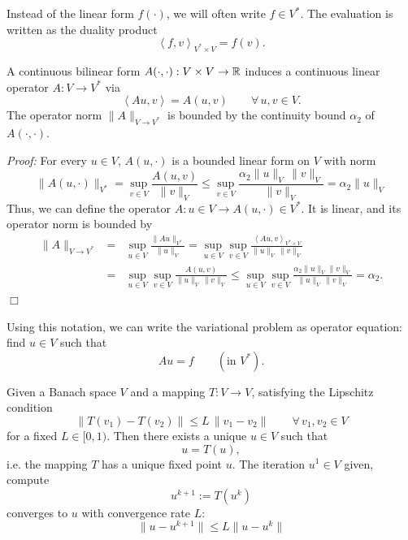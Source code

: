 \bigskip

Instead of the linear form $f(\cdot)$, we will often write $f \in V^\ast$. The evaluation is written as the duality product 
$$
\left< f , v \right>_{V^\ast \times V} = f(v).
$$

\begin{lemma}A continuous bilinear form $A(\cdot,\cdot) : V \times V \rightarrow {\mathbb R}$
induces a continuous linear operator $A : V \rightarrow V^\ast$ via
$$
\left< A u, v \right> = A(u,v) \qquad \forall \, u,v \in V.
$$
The operator norm $\| A \|_{V \rightarrow V^\ast}$ is bounded by the continuity bound $\alpha_2$ of $A(\cdot,\cdot)$. 
\end{lemma}
\noindent
{\em Proof:} For every $u \in V$, $A(u,\cdot)$ is a bounded linear form on $V$
with norm
$$
\| A(u,\cdot) \|_{V^\ast} = 
\sup_{v \in V} \frac{A(u,v)}{ \| v \|_V} 
\leq \sup_{v \in V} \frac{\alpha_2 \| u \|_V \, \| v \|_V }{ \| v \|_V} 
= \alpha_2 \| u \|_V
$$
Thus, we can define the operator $A : u \in V \rightarrow A(u,\cdot) \in V^\ast$. 
It is linear, and its operator norm is bounded by
\begin{eqnarray*}
\| A \|_{V \rightarrow V^\ast} & = &
\sup_{u\in V} \frac{ \| A u \|_{V^\ast}}{\| u \|_V} =
\sup_{u\in V} \sup_{v \in V} \frac{ \left< A u, v\right>_{V^\ast \times V} } {\| u \|_V \, \| v \|_V} \\
& = & \sup_{u\in V} \sup_{v \in V} \frac{ A (u,v) } {\| u \|_V \, \| v \|_V} \leq
\sup_{u\in V} \sup_{v\in V} \frac{ \alpha_2 \| u \|_V \| v \|_V } {\| u \|_V \, \| v \|_V} = \alpha_2.
\end{eqnarray*}
\hfill $\Box$

Using this notation, we can write the variational problem as operator equation: find $u \in V$ such that
$$
A u = f \qquad (\mbox{in } V^\ast).
$$

\begin{theorem} Given a Banach space
$V$ and a mapping $T : V \rightarrow V$, satisfying the Lipschitz condition
$$
\| T(v_1) - T(v_2) \| \leq L \, \| v_1 - v_2 \| \qquad \forall  \, v_1, v_2 \in V
$$
for a fixed $L \in [0,1)$. Then there exists a unique $u \in V$ such that
$$
u = T(u),
$$
i.e. the mapping $T$ has a unique fixed point $u$. The iteration $u^1 \in V$ given, compute
$$
u^{k+1} := T(u^k)
$$
converges to $u$ with convergence rate $L$:
$$
\| u - u^{k+1} \| \leq L \| u - u^k \|
$$
\end{theorem}


